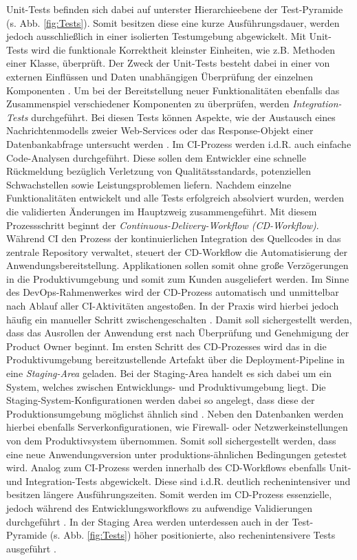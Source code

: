 \vspace*{-10mm}
Unit-Tests befinden sich dabei auf unterster Hierarchieebene der Test-Pyramide (s. Abb. \ref*{fig:Tests}). Somit besitzen diese eine kurze Ausführungsdauer, werden jedoch ausschließlich in einer isolierten Testumgebung abgewickelt. Mit Unit-Tests wird die funktionale Korrektheit kleinster Einheiten, wie z.B. Methoden einer Klasse, über\-prüft. Der Zweck der Unit-Tests besteht dabei in einer von externen Einflüssen und Daten unabhängigen Überprüfung der einzelnen Komponenten \cite[Kap. 2]{Hambling.2015}. Um bei der Bereitstellung neuer Funktionalitäten ebenfalls das Zusammenspiel verschiedener Komponenten zu überprüfen, werden \textit{Integration-Tests} durchgeführt. Bei diesen Tests können Aspekte, wie der Austausch eines Nachrichtenmodells zweier Web-Services oder das Response-Objekt einer Datenbankabfrage untersucht werden \cite[Kap. 2]{Hambling.2015}. Im CI-Prozess werden i.d.R. auch einfache Code-Analysen durchgeführt. Diese sollen dem Entwickler eine schnelle Rückmeldung bezüglich Verletzung von Qualitätsstandards, potenziellen Schwachstellen sowie Leistungsproblemen liefern. Nachdem einzelne Funktionalitäten entwickelt und alle Tests erfolgreich absolviert wurden, werden die validierten Än\-derungen im Hauptzweig zusammengeführt. Mit diesem Prozessschritt beginnt der \textit{Continuous-Delivery-Workflow (\acs{CD}-Workflow)}.  Während CI den Prozess der kontinuierlichen Integration des Quellcodes in das zentrale Repository verwaltet, steuert der CD-Workflow die Automatisierung der Anwendungsbereitstellung. Applikationen sollen somit ohne große Verzögerungen in die Produktivumgebung und somit zum Kunden ausgeliefert werden. Im Sinne des DevOps-Rahmenwerkes wird der CD-Prozess automatisch und unmittelbar nach Ablauf aller CI-Aktivitäten angestoßen. In der Praxis wird hierbei jedoch häufig ein manueller Schritt zwischengeschalten \cite[20]{Halstenberg.2020}. Damit soll sichergestellt werden, dass das Ausrollen der Anwendung erst nach Überprüfung und Genehmigung der Product Owner beginnt. Im ersten Schritt des CD-Prozesses wird das in die Produktivumgebung bereitzustellende Artefakt über die Deployment-Pipeline in eine \textit{Staging-Area} geladen. Bei der Staging-Area handelt es sich dabei um ein System, welches zwischen Entwicklungs- und Produktivumgebung liegt. Die Staging-System-Konfigurationen werden dabei so angelegt, dass diese der Produktionsumgebung möglichst ähnlich sind \cite[Kap. 1.3]{Labouardy.2021}. Neben den Datenbanken werden hierbei ebenfalls Serverkonfigurationen, wie Firewall- oder Netzwerkeinstellungen von dem Produktivsystem übernommen. Somit soll sichergestellt werden, dass eine neue Anwendungsversion unter produktions-ähnlichen Bedingungen getestet wird. Analog zum CI-Prozess werden innerhalb des CD-Workflows ebenfalls Unit- und Integration-Tests abgewickelt. Diese sind i.d.R. deutlich rechenintensiver und besitzen längere Ausführungszeiten. Somit werden im CD-Prozess essenzielle, jedoch während des Entwicklungsworkflows zu aufwendige Validierungen durchgeführt \cite[20]{Halstenberg.2020}. In der Staging Area werden unterdessen auch in der Test-Pyramide (s. Abb. \ref*{fig:Tests}) höher positionierte, also rechenintensivere Tests ausgeführt \cite[Kap. 2]{Hambling.2015}. 